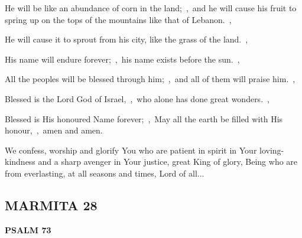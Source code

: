 \documentclass[12pt,twoside,a5paper]{article}
\newcommand{\marmita}[1]{\subsection*{MARMITA {#1}}}
\newcommand{\psalm}[1]{\textbf{PSALM {#1}}\nopagebreak}
\newcommand{\slota}[1]{\liturgicalhint{Slota.} #1}
\begin{document}
\begin{normalparskip}
  He will be like an abundance of corn in the land;~\sep\ and he will cause his fruit to spring up on the tops of the mountains like that of Lebanon.~\sep

  He will cause it to sprout from his city, like the grass of the land.~\sep

  His name will endure forever;~\sep\ his name exists before the sun.~\sep

  All the peoples will be blessed through him;~\sep\ and all of them will praise him.~\sep

  Blessed is the Lord God of Israel,~\sep\ who alone has done great wonders.~\sep

  Blessed is His honoured Name forever;~\sep\ May all the earth be filled with His honour,~\sep\ amen and amen.
\end{normalparskip}

\slota{We confess, worship and glorify You who are patient in spirit in Your loving-kindness and a sharp avenger in Your justice, great King of glory, Being who are from everlasting, at all seasons and times, Lord of all...}

\marmita{28}

\psalm{73}
\end{document}
